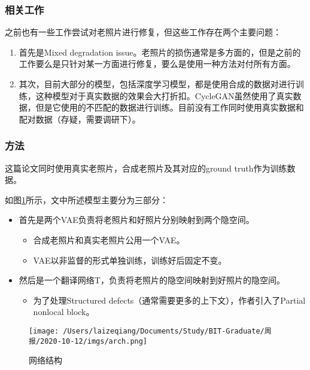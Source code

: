 \documentclass[10pt]{article}
\begin{document}
\subsubsection{相关工作}

之前也有一些工作尝试对老照片进行修复，但这些工作存在两个主要问题：

\begin{enumerate}
\item
  首先是Mixed degradation
  issue。老照片的损伤通常是多方面的，但是之前的工作要么是只针对某一方面进行修复，要么是使用一种方法对付所有方面。
\item
  其次，目前大部分的模型，包括深度学习模型，都是使用合成的数据对进行训练，这种模型对于真实数据的效果会大打折扣。CycleGAN虽然使用了真实数据，但是它使用的不匹配的数据进行训练。目前没有工作同时使用真实数据和配对数据（存疑，需要调研下）。
\end{enumerate}

\subsubsection{方法}

这篇论文同时使用真实老照片，合成老照片及其对应的ground
truth作为训练数据。

如图\ref{arch}所示，文中所述模型主要分为三部分：

\begin{itemize}
\item
  首先是两个VAE\cite{kingma2014autoencoding}负责将老照片和好照片分别映射到两个隐空间。

  \begin{itemize}
  \item
    合成老照片和真实老照片公用一个VAE。
  \item
    VAE以非监督的形式单独训练，训练好后固定不变。
  \end{itemize}
\item
  然后是一个翻译网络T，负责将老照片的隐空间映射到好照片的隐空间。

  \begin{itemize}
  \item
    为了处理Structured
    defects（通常需要更多的上下文），作者引入了Partial nonlocal block\cite{wang2018nonlocal}。
  \end{itemize}
\end{itemize}

\begin{figure}
\centering
\texttt{[image: /Users/laizeqiang/Documents/Study/BIT-Graduate/周报/2020-10-12/imgs/arch.png]}
\caption{网络结构}
\label{arch}
\end{figure}
\end{document}
